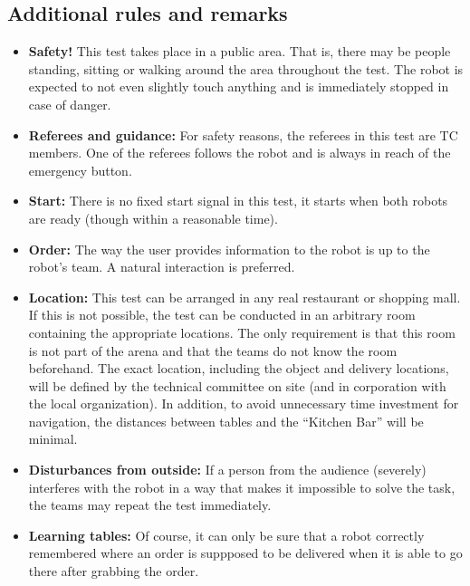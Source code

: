 \subsection{Additional rules and remarks}

\begin{itemize}
	\item \textbf{Safety!} This test takes place in a public area. That is, there may be people standing, sitting or walking around the area throughout the test. The robot is expected to not even slightly touch anything and is immediately stopped in case of danger.

	\item \textbf{Referees and guidance:} For safety reasons, the referees in this test are TC members. One of the referees follows the robot and is always in reach of the emergency button.

	\item \textbf{Start:} There is no fixed start signal in this test, it starts when both robots are ready (though within a reasonable time).

	\item \textbf{Order:} The way the user provides information to the robot is up to the robot's team. A natural interaction is preferred.

	\item \textbf{Location:} This test can be arranged in any real restaurant or shopping mall. If this is not possible, the test can be conducted in an arbitrary room containing the appropriate locations. 
	  The only requirement is that this room is not part of the arena and that the teams do not know the room beforehand. 
	  The exact location, including the object and delivery locations, will be defined by the technical committee on site (and in corporation with the local organization). 
	  In addition, to avoid unnecessary time investment for navigation, the distances between tables and the ``Kitchen Bar'' will be minimal.

	\item \textbf{Disturbances from outside:} If a person from the audience (severely) interferes with the robot in a way that makes it impossible to solve the task, the teams may repeat the test immediately.

	\item \textbf{Learning tables:} Of course, it can only be sure that a robot correctly remembered where an order is suppposed to be delivered when it is able to go there after grabbing the order. 
	

\end{itemize}
